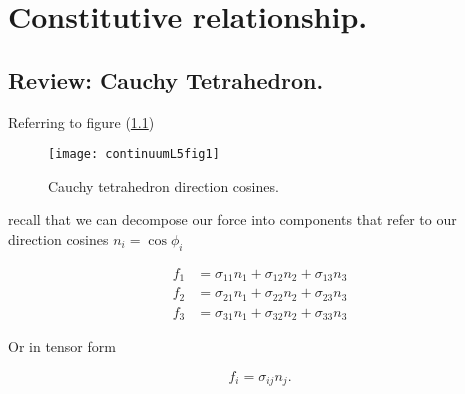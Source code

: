 %
%

\chapter{Constitutive relationship.}
\label{chap:continuumL5}
{}
\date{Jan 25, 2012}

\beginArtWithToc

%

\section{Review: Cauchy Tetrahedron.}

Referring to figure (\ref{fig:continuumL5:continuumL5fig1})
\begin{figure}[htp]
   \centering
   \texttt{[image: continuumL5fig1]}
   \caption{Cauchy tetrahedron direction cosines.}\label{fig:continuumL5:continuumL5fig1}
\end{figure}

recall that we can decompose our force into components that refer to our direction cosines $n_i = \cos\phi_i$

\begin{align}\label{eqn:continuumL5:10}
f_1 &= \sigma_{11} n_1 + \sigma_{12} n_2 + \sigma_{13} n_3 \\
f_2 &= \sigma_{21} n_1 + \sigma_{22} n_2 + \sigma_{23} n_3 \\
f_3 &= \sigma_{31} n_1 + \sigma_{32} n_2 + \sigma_{33} n_3
\end{align}

Or in tensor form

\begin{equation}\label{eqn:continuumL5:30}
f_i = \sigma_{ij} n_j.
\end{equation}

